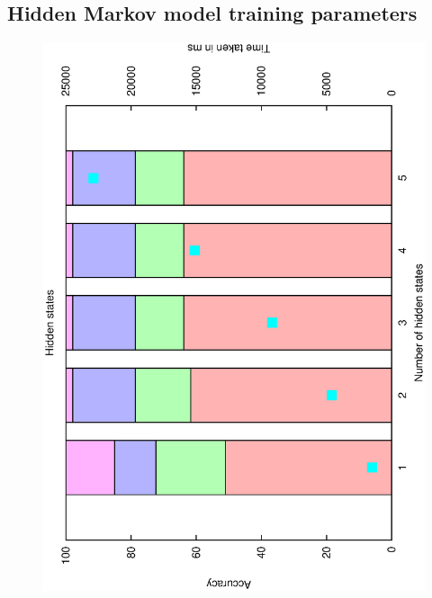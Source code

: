 \documentclass[12pt,a4,notitlepage]{report}
\renewcommand{\_}{\texttt{\symbol{95}}}
\newcommand{\<}{\texttt{\symbol{60}}}
\renewcommand{\>}{\texttt{\symbol{62}}}
\begin{document}
\subsection{Hidden Markov model training parameters}
\begin{figure}
\centering
\includegraphics[scale=0.3,angle=-90]{results/markov/m_hidden_states.ps}

\end{figure}
\end{document}

